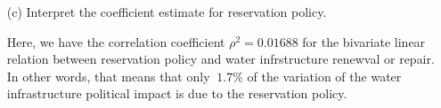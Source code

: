 \documentclass[12pt,letterpaper]{article}
\begin{document}
\begin{enumerate}
	\item [(c)] Interpret the coefficient estimate for reservation policy. 

	Here, we have 	 the correlation coefficient $\rho^2=  0.01688$ for the bivariate linear relation between reservation policy and water infrstructure renewval or repair. In other words, that means that only $~1.7\%$ of the variation of the water infrastructure political impact is due to the reservation policy.

\end{enumerate}
\end{document}

